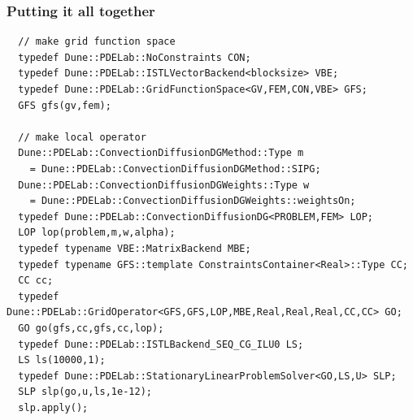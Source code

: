 \begin{frame}[fragile]
  \frametitle{Putting it all together}
  \scriptsize
  \begin{lstlisting}
  // make grid function space 
  typedef Dune::PDELab::NoConstraints CON;
  typedef Dune::PDELab::ISTLVectorBackend<blocksize> VBE;
  typedef Dune::PDELab::GridFunctionSpace<GV,FEM,CON,VBE> GFS;
  GFS gfs(gv,fem);

  // make local operator
  Dune::PDELab::ConvectionDiffusionDGMethod::Type m
    = Dune::PDELab::ConvectionDiffusionDGMethod::SIPG;
  Dune::PDELab::ConvectionDiffusionDGWeights::Type w
    = Dune::PDELab::ConvectionDiffusionDGWeights::weightsOn;
  typedef Dune::PDELab::ConvectionDiffusionDG<PROBLEM,FEM> LOP;
  LOP lop(problem,m,w,alpha);
  typedef typename VBE::MatrixBackend MBE;
  typedef typename GFS::template ConstraintsContainer<Real>::Type CC;
  CC cc;
  typedef Dune::PDELab::GridOperator<GFS,GFS,LOP,MBE,Real,Real,Real,CC,CC> GO;
  GO go(gfs,cc,gfs,cc,lop);
  typedef Dune::PDELab::ISTLBackend_SEQ_CG_ILU0 LS;
  LS ls(10000,1);
  typedef Dune::PDELab::StationaryLinearProblemSolver<GO,LS,U> SLP;
  SLP slp(go,u,ls,1e-12);
  slp.apply();
  \end{lstlisting}
\end{frame}


  
